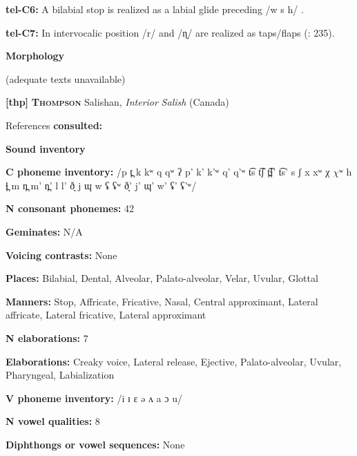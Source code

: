 \textbf{tel-C6:} A bilabial stop is realized as a labial glide preceding /w s h/ \citep[207]{Krishnamurti1998}.



\textbf{tel-C7:} In intervocalic position /r/ and /ɳ/ are realized as taps/flaps (\citealt{BhaskararaoRay2017}: 235).



\textbf{Morphology}



(adequate texts unavailable)



\textbf{[thp]}   \textbf{\textsc{Thompson}}  Salishan, \textit{Interior} \textit{Salish} (Canada)



References \textbf{consulted:} \citet{Koch2008,ThompsonThompson1992,ThompsonThompson1996}



\textbf{Sound inventory}



\textbf{C phoneme inventory:} /p t̪ k kʷ q qʷ ʔ p’ k’ k’ʷ q’ q’ʷ t͡s t͡ʃ t̪͡ɬ’ t͡s’ s ʃ x xʷ χ $\chi ʷ$ h ɬ̪ m n̪ m’ n̪’ l l’ ð̞ j ɰ w ʢ ʢʷ ð̞’ j’ ɰ’ w’ ʢ’ ʢ’ʷ/



\textbf{N consonant phonemes:} 42



\textbf{Geminates:} N/A



\textbf{Voicing contrasts:} None



\textbf{Places:} Bilabial, Dental, Alveolar, Palato-alveolar, Velar, Uvular, Glottal 



\textbf{Manners:} Stop, Affricate, Fricative, Nasal, Central approximant, Lateral affricate, Lateral fricative, Lateral approximant



\textbf{N elaborations:} 7



\textbf{Elaborations:} Creaky voice, Lateral release, Ejective, Palato-alveolar, Uvular, Pharyngeal, Labialization



\textbf{V phoneme inventory:} /i ɪ ɛ ə ʌ a ɔ u/



\textbf{N vowel qualities:} 8



\textbf{Diphthongs or vowel sequences:} None



